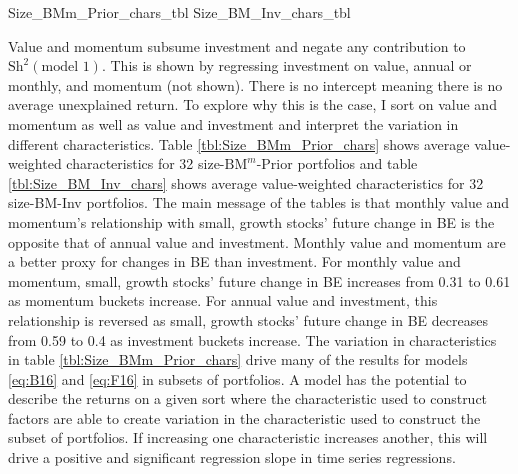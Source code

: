 
{Size_BMm_Prior_chars_tbl}
{Size_BM_Inv_chars_tbl}

Value and momentum subsume investment and negate any contribution to
$\text{Sh}^2(\text{model 1})$.
This is shown by regressing investment on value, annual or monthly,
and momentum (not shown).
There is no intercept meaning there is no average unexplained return.
To explore why this is the case, I sort on value and momentum as well as
value and investment and interpret the variation in different
characteristics.
Table \ref{tbl:Size_BMm_Prior_chars} shows average value-weighted
characteristics for 32 size-$\text{BM}^m$-Prior portfolios and table
\ref{tbl:Size_BM_Inv_chars} shows average value-weighted characteristics for 32
size-BM-Inv portfolios.
The main message of the tables is that monthly value and momentum's
relationship with small, growth stocks' future change in BE is the opposite
that of annual value and investment.
Monthly value and momentum are a better proxy for changes in BE than investment.
For monthly value and momentum, small, growth stocks' future change in BE increases
from 0.31 to 0.61 as momentum buckets increase.
For annual value and investment, this relationship is reversed as small, growth stocks'
future change in BE decreases from 0.59 to 0.4 as investment buckets increase.
The variation in characteristics in table \ref{tbl:Size_BMm_Prior_chars} drive
many of the results for models \ref{eq:B16} and \ref{eq:F16} in subsets of portfolios.
A model has the potential to describe the returns on a given sort where the
characteristic used to construct factors are able to create variation in the
characteristic used to construct the subset of portfolios.
If increasing one characteristic increases another, this will drive
a positive and significant regression slope in time series regressions.


